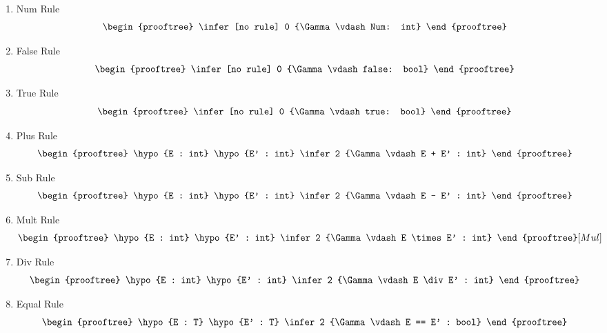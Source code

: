 \begin{multicols}{2}
\begin{enumerate}

    \item Num Rule
    \[
        \begin{prooftree}
            \infer [no rule] 0 {\Gamma \vdash Num: int}
        \end{prooftree} 
    \] 
    \item False Rule
    \[
        \begin{prooftree}
            \infer [no rule] 0 {\Gamma \vdash false: bool}
        \end{prooftree}
    \]
    \item True Rule
    \[
        \begin{prooftree}
            \infer [no rule] 0 {\Gamma \vdash true: bool}
        \end{prooftree}
    \]
    \item Plus Rule
        \[
            \begin{prooftree}
                \hypo {E : int}
                \hypo {E' : int}
                \infer 2 {\Gamma \vdash E + E' : int}
            \end{prooftree}
        \]
    \item Sub Rule
        \[
            \begin{prooftree}
                \hypo {E : int}
                \hypo {E' : int}
                \infer 2 {\Gamma \vdash E - E' : int}
            \end{prooftree}
        \]
    \item Mult Rule
        \[
            \begin{prooftree}
                \hypo {E : int}
                \hypo {E' : int}
                \infer 2 {\Gamma \vdash E \times E' : int}
            \end{prooftree} [Mul]
        \]
    \item Div Rule
        \[
            \begin{prooftree}
                \hypo {E : int}
                \hypo {E' : int}
                \infer 2 {\Gamma \vdash E \div E' : int}
            \end{prooftree} 
        \]
    \item Equal Rule
        \[
            \begin{prooftree}
                \hypo {E : T}
                \hypo {E' : T}
                \infer 2 {\Gamma \vdash E == E' : bool}

\end{prooftree}\]
\end{enumerate}
\end{multicols}

